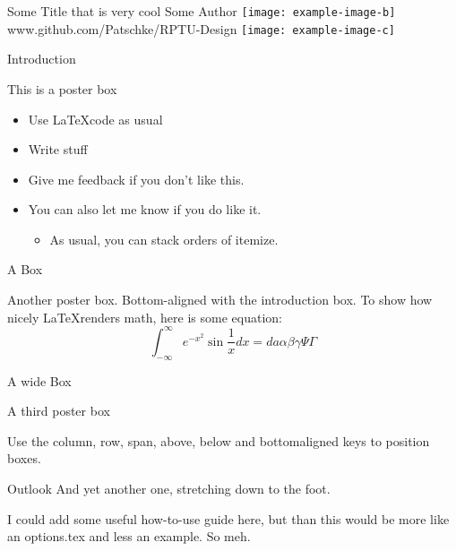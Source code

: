 \documentclass[
  a0paper,
  portrait,
  fontscale=.35 %
  ]{baposterrptu}
\begin{document}
\begin{poster}{
  }
  {}
  {Some Title that is very cool }
  {Some Author}
  {\rptuLogo}
  \footer
  {\hfill
    \texttt{[image: example-image-b]}
    \hfill
    \color{white} \huge www.github.com/Patschke/RPTU-Design
    \hfill
    \texttt{[image: example-image-c]}
    \hfill}
  \begin{posterbox}[name=intro,column=0,row=0]{Introduction}

    This is a poster box

    \begin{itemize}
      \item Use \LaTeX code as usual
      \item Write stuff
      \item Give me feedback if you don't like this.
      \item You can also let me know if you do like it.
            \begin{itemize}
              \item As usual, you can stack orders of itemize.
            \end{itemize}
    \end{itemize}

  \end{posterbox}

  \begin{posterbox}[name=test,column=1,row=0, bottomaligned=intro]{A Box}

    Another poster box. Bottom-aligned with the introduction box. To show how nicely \LaTeX renders math, here is some equation:
    $$\int_{-\infty}^{\infty}e^{-x^2}\sin{\frac{1}{x}}dx =da \alpha\beta\gamma\Psi\Gamma$$

  \end{posterbox}

  \begin{posterbox}[name=test2,column=0,below=intro, span=2]{A wide Box}

    A third poster box

    Use the column, row, span, above, below and bottomaligned keys to position boxes.

  \end{posterbox}

  \begin{posterbox}[above=foot, below=test2, column=1]{Outlook}
    And yet another one, stretching down to the foot.

    I could add some useful how-to-use guide here, but than this would be more like an options.tex and less an example. So meh.
  \end{posterbox}

\end{poster}
\end{document}
